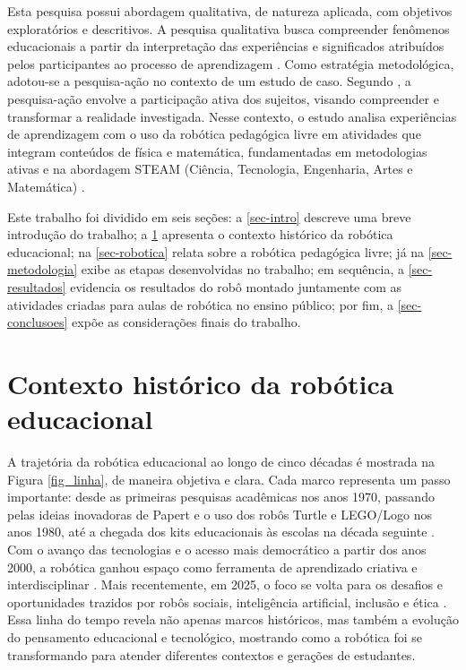 \documentclass[portuguese]{textolivre}
\begin{document}
Esta pesquisa possui abordagem qualitativa, de natureza aplicada, com objetivos exploratórios e descritivos. A pesquisa qualitativa busca compreender fenômenos educacionais a partir da interpretação das experiências e significados atribuídos pelos participantes ao processo de aprendizagem \cite{meto1}. Como estratégia metodológica, adotou-se a pesquisa-ação no contexto de um estudo de caso. Segundo \textcite{meto2}, a pesquisa-ação envolve a participação ativa dos sujeitos, visando compreender e transformar a realidade investigada. Nesse contexto, o estudo analisa experiências de aprendizagem com o uso da robótica pedagógica livre em atividades que integram conteúdos de física e matemática, fundamentadas em metodologias ativas e na abordagem STEAM (Ciência, Tecnologia, Engenharia, Artes e Matemática) \cite{ref3,ref4}.

Este trabalho foi dividido em seis seções: a \cref{sec-intro} descreve uma breve introdução do trabalho; a \cref{sec-historico} apresenta o contexto histórico da robótica educacional; na \cref{sec-robotica} relata sobre a robótica pedagógica livre; já na \cref{sec-metodologia} exibe as etapas desenvolvidas no trabalho; em sequência, a \cref{sec-resultados} evidencia os resultados do robô montado juntamente com as atividades criadas para aulas de robótica no ensino público; por fim, a \cref{sec-conclusoes} expõe as considerações finais do trabalho.


\section{Contexto histórico da robótica educacional}\label{sec-historico}

A trajetória da robótica educacional ao longo de cinco décadas é mostrada na Figura \ref{fig_linha}, de maneira objetiva e clara. Cada marco representa um passo importante: desde as primeiras pesquisas acadêmicas nos anos 1970, passando pelas ideias inovadoras de Papert e o uso dos robôs Turtle e LEGO/Logo nos anos 1980, até a chegada dos kits educacionais às escolas na década seguinte \cite{ref0,ref10}. Com o avanço das tecnologias e o acesso mais democrático a partir dos anos 2000, a robótica ganhou espaço como ferramenta de aprendizado criativa e interdisciplinar \cite{ref16}. Mais recentemente, em 2025, o foco se volta para os desafios e oportunidades trazidos por robôs sociais, inteligência artificial, inclusão e ética \cite{ref1,ref11,ref12}. Essa linha do tempo revela não apenas marcos históricos, mas também a evolução do pensamento educacional e tecnológico, mostrando como a robótica foi se transformando para atender diferentes contextos e gerações de estudantes.
\end{document}
